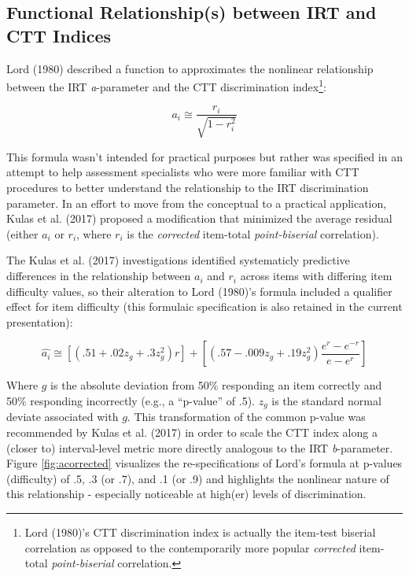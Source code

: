 \documentclass[
  man]{apa6}
\begin{document}
\hypertarget{functional-relationships-between-irt-and-ctt-indices}{%
\subsection{Functional Relationship(s) between IRT and CTT Indices}\label{functional-relationships-between-irt-and-ctt-indices}}

Lord (1980) described a function to approximates the nonlinear relationship between the IRT \emph{a}-parameter and the CTT discrimination index\footnote{Lord (1980)'s CTT discrimination index is actually the item-test biserial correlation as opposed to the contemporarily more popular \emph{corrected} item-total \emph{point-biserial} correlation.}:

\begin{equation}
a_i\cong \frac{r_i}{\sqrt{1-r_i^2}}
\end{equation}

This formula wasn't intended for practical purposes but rather was specified in an attempt to help assessment specialists who were more familiar with CTT procedures to better understand the relationship to the IRT discrimination parameter. In an effort to move from the conceptual to a practical application, Kulas et al. (2017) proposed a modification that minimized the average residual (either \(a_i\) or \(r_i\), where \(r_i\) is the \emph{corrected} item-total \emph{point-biserial} correlation).

The Kulas et al. (2017) investigations identified systematicly predictive differences in the relationship between \(a_i\) and \(r_i\) across items with differing item difficulty values, so their alteration to Lord (1980)'s formula included a qualifier effect for item difficulty (this formulaic specification is also retained in the current presentation):

\begin{equation}
\hat{a_i}\cong[(.51 + .02z_g + .3z_g^2)r]+[(.57 - .009z_g + .19z_g^2)\frac{e^r-e^{-r}}{e-e^r}]
\end{equation}

Where \(g\) is the absolute deviation from 50\% responding an item correctly and 50\% responding incorrectly (e.g., a ``p-value'' of .5). \(z_g\) is the standard normal deviate associated with \(g\). This transformation of the common p-value was recommended by Kulas et al. (2017) in order to scale the CTT index along a (closer to) interval-level metric more directly analogous to the IRT \emph{b}-parameter. Figure \ref{fig:acorrected} visualizes the re-specifications of Lord's formula at p-values (difficulty) of .5, .3 (or .7), and .1 (or .9) and highlights the nonlinear nature of this relationship - especially noticeable at high(er) levels of discrimination.
\end{document}
